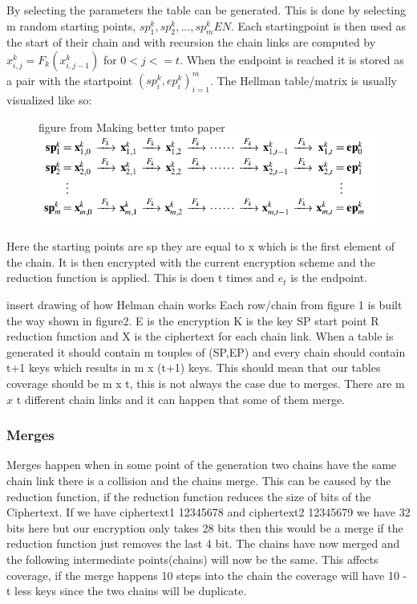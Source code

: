 By selecting the parameters the table can be generated. This is done by selecting m random starting points, $ sp^{k}_1,sp^{k}_2,...,sp^{k}_m E N$. Each startingpoint is then used as the start of their chain and with recursion the chain links are computed by $ x^{k}_{i,j}=F_k( x^{k}_{i,j-1})$ for $0<j<=t$. When the endpoint is reached it is stored as a pair with the startpoint ${( sp^{k}_{i}, ep^{k}_{i})}^{m}_{i=1}$.
The Hellman table/matrix is usually visualized like so:
\\
\begin{figure}[th]
  figure from Making better tmto paper
  \includegraphics[width=\textwidth]{figures/HellmanMatrix.png}
  \centering
\end{figure}

Here the starting points are sp they are equal to x which is the first element of the chain. It is then encrypted with the current encryption scheme and the reduction function is applied. This is doen t times and $e_t$ is the endpoint.

insert drawing of how Helman chain works
Each row/chain from figure 1 is built the way shown in figure2. E is the encryption K is the key SP start point R reduction function and X is the ciphertext for each chain link. When a table is generated it should contain m touples of (SP,EP) and every chain should contain t+1 keys which results in m x (t+1) keys. This should mean that our tables coverage should be m x t, this is not always the case due to merges.
There are m $x$ t different chain links and it can happen that some of them merge.


\subsubsection{Merges}
Merges happen when in some point of the generation two chains have the same chain link there is a collision and the chains merge. This can be caused by the reduction function, if the reduction function reduces the size of bits of the Ciphertext. If we have ciphertext1 12345678 and ciphertext2 12345679 we have 32 bits here but our encryption only takes 28 bits then this would be a merge if the reduction function just removes the last 4 bit. The chains have now merged and the following intermediate points(chains) will now be the same. This affects coverage, if the merge happens 10 steps into the chain the coverage  will have 10 - t less keys since the two chains will be duplicate.

